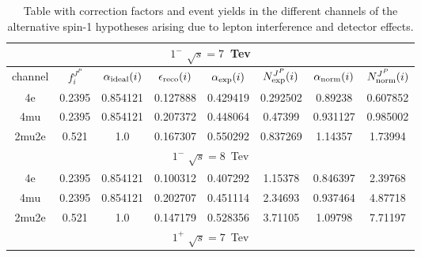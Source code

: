 \begin{table}[b]
\centering
\caption{
Table with correction factors and event yields in the different
channels of the alternative spin-1 hypotheses arising
due to lepton interference and detector effects.}
\centering %
\begin{tabular}{c c c c c c c c} %
\hline \hline

 \multicolumn{8}{|c|}{$1^{-}$ $\sqrt{s}=7$~Tev} \\ \hline 

channel & $f_{i}^{J^P}$ & $\alpha_{\rm ideal} (i)$ & $\epsilon_{\rm reco} (i)$ & $\alpha_{\rm exp} (i)$ & $N^{J^P}_{\rm exp} (i)$ & $\alpha_{\rm norm} (i)$ & $N^{J^P}_{\rm norm} (i)$\\ \hline 
4e & 0.2395 & 0.854121 & 0.127888 & 0.429419
 & 0.292502%
 & 0.89238 & 0.607852 \\ \hline 
4mu & 0.2395 & 0.854121 & 0.207372 & 0.448064
 & 0.47399%
 & 0.931127 & 0.985002 \\ \hline 
2mu2e & 0.521 & 1.0  & 0.167307 & 0.550292
 & 0.837269%
 & 1.14357 & 1.73994 \\ \hline \hline 

 \multicolumn{8}{|c|}{$1^{-}$ $\sqrt{s}=8$~Tev} \\ \hline 

4e & 0.2395 & 0.854121 & 0.100312 & 0.407292
 & 1.15378%
 & 0.846397 & 2.39768 \\ \hline 
4mu & 0.2395 & 0.854121 & 0.202707 & 0.451114
 & 2.34693%
 & 0.937464 & 4.87718 \\ \hline 
2mu2e & 0.521 & 1.0  & 0.147179 & 0.528356
 & 3.71105%
 & 1.09798 & 7.71197 \\ \hline \hline 

 \multicolumn{8}{|c|}{$1^{+}$ $\sqrt{s}=7$~Tev} \\ \hline 


\end{tabular}
\end{table}
